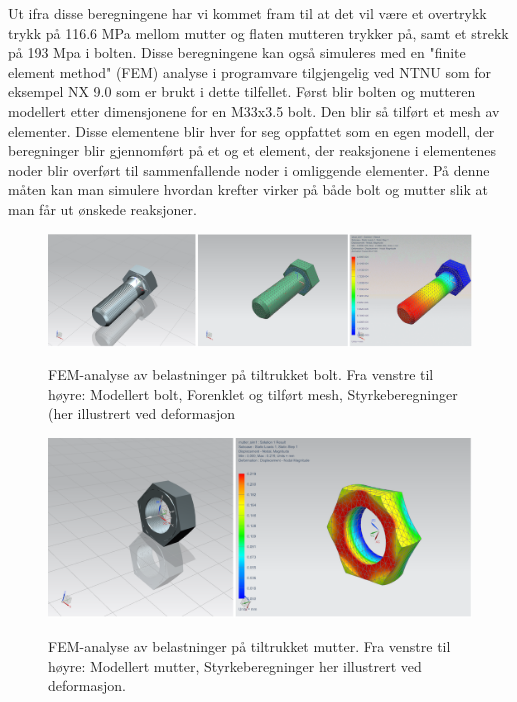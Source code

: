 Ut ifra disse beregningene har vi kommet fram til at det vil være et overtrykk trykk på 116.6 MPa mellom mutter og flaten mutteren trykker på, samt et strekk på 193 Mpa i bolten. Disse beregningene kan også simuleres med en "finite element method" (FEM) analyse i programvare tilgjengelig ved NTNU som for eksempel NX 9.0 som er brukt i dette tilfellet. Først blir bolten og mutteren modellert etter dimensjonene for en M33x3.5 bolt. Den blir så tilført et mesh av elementer. Disse elementene blir hver for seg oppfattet som en egen modell, der beregninger blir gjennomført på et og et element, der reaksjonene i elementenes noder blir overført til sammenfallende noder i omliggende elementer. På denne måten kan man simulere hvordan krefter virker på både bolt og mutter slik at man får ut ønskede reaksjoner.

\begin{figure}[H]
		\centering
		\includegraphics[width=1.00\textwidth]{images/Rapportbilde_skrue.png}
		\label{fig:FEMskrue}
		\caption{FEM-analyse av belastninger på tiltrukket bolt. Fra venstre til høyre: Modellert bolt, Forenklet og tilført mesh, Styrkeberegninger (her illustrert ved deformasjon}
	\end{figure}
\begin{figure}[H]
		\centering
		\includegraphics[width=1.00\textwidth]{images/Rapportbilde_mutter.png}
		\label{fig:FEMmutter}
		\caption{FEM-analyse av belastninger på tiltrukket mutter. Fra venstre til høyre: Modellert mutter, Styrkeberegninger her illustrert ved deformasjon.}
	\end{figure}

 